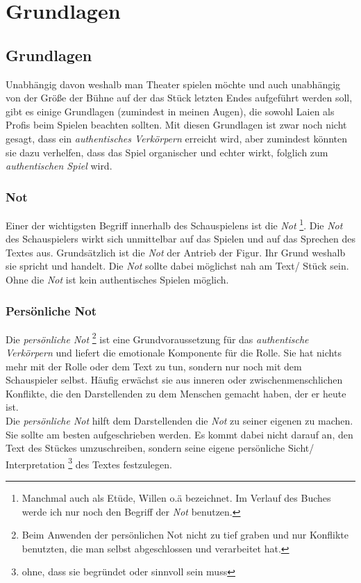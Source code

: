 \documentclass[ngerman, a4paper, twoside]{scrbook}%
\begin{document}
	\vfill


	\mainmatter
	\part{Grundlagen}
	\chapter{Grundlagen}
	Unabhängig davon weshalb man Theater spielen möchte und auch unabhängig von der Größe der Bühne auf der das Stück letzten Endes aufgeführt werden soll, gibt es einige Grundlagen (zumindest in meinen Augen), die sowohl Laien als Profis beim Spielen beachten sollten. Mit diesen Grundlagen ist zwar noch nicht gesagt, dass ein \emph{authentisches Verkörpern}
	 erreicht wird, aber zumindest könnten sie dazu verhelfen, dass das Spiel organischer und echter wirkt, folglich zum \emph{authentischen Spiel} %
	 wird.
	\section{Not}
	Einer der wichtigsten Begriff innerhalb des Schauspielens ist die \emph{Not} \footnote{Manchmal auch als Etüde, Willen o.ä bezeichnet. Im Verlauf des Buches werde ich nur noch den Begriff der \emph{Not} benutzen.}. Die \emph{Not} des Schauspielers wirkt sich unmittelbar auf das Spielen und auf das Sprechen des Textes aus. Grundsätzlich ist die \emph{Not} der Antrieb der Figur. Ihr Grund weshalb sie spricht und handelt. Die \emph{Not} sollte dabei möglichst nah am Text/ Stück  sein. Ohne die \emph{Not} ist kein authentisches Spielen möglich.

	\section{Persönliche Not}
	Die \emph{persönliche Not}
	\footnote{Beim Anwenden der persönlichen Not nicht zu tief graben und nur Konflikte benutzten, die man selbst abgeschlossen und verarbeitet hat.}
	ist eine Grundvoraussetzung für das \emph{authentische Verkörpern} und liefert die emotionale Komponente für die Rolle.  Sie hat nichts mehr mit der Rolle oder dem Text zu tun, sondern nur noch mit dem Schauspieler selbst. Häufig erwächst sie aus inneren oder zwischenmenschlichen Konflikte, die  den Darstellenden zu dem Menschen gemacht haben, der er heute ist. \\
	Die \emph{persönliche Not} hilft dem Darstellenden die \emph{Not} zu seiner eigenen zu machen. Sie sollte am besten aufgeschrieben werden. Es kommt dabei nicht darauf an, den Text des Stückes umzuschreiben, sondern seine eigene persönliche Sicht/ Interpretation
	\footnote{ohne, dass sie begründet oder sinnvoll sein muss}
	 des Textes festzulegen.
	 \vfill
\end{document}
